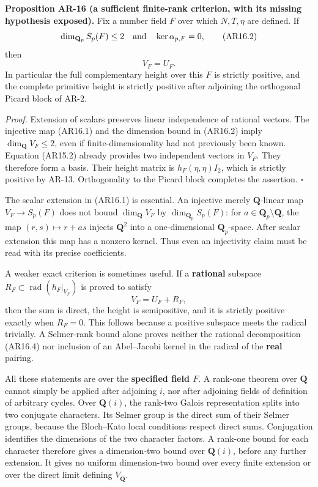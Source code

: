 \textbf{Proposition AR-16 (a sufficient finite-rank criterion, with its
missing hypothesis exposed).} Fix a number field \(F\) over which
\(N,T,\eta\) are defined. If \[
\dim_{\mathbf Q_p}S_p(F)\le2
\quad\hbox{and}\quad
\ker\alpha_{p,F}=0,
\tag{AR16.2}
\] then \[
V_F=U_F.
\tag{AR16.3}
\] In particular the full complementary height over this \(F\) is
strictly positive, and the complete primitive height is strictly
positive after adjoining the orthogonal Picard block of AR-2.

\emph{Proof.} Extension of scalars preserves linear independence of
rational vectors. The injective map (AR16.1) and the dimension bound in
(AR16.2) imply \(\dim_{\mathbf Q}V_F\le2\), even if
finite-dimensionality had not previously been known. Equation (AR15.2)
already provides two independent vectors in \(V_F\). They therefore form
a basis. Their height matrix is \(h_F(\eta,\eta)I_2\), which is strictly
positive by AR-13. Orthogonality to the Picard block completes the
assertion. \(\square\)

The scalar extension in (AR16.1) is essential. An injective merely
\(\mathbf Q\)-linear map \(V_F\to S_p(F)\) does not bound
\(\dim_{\mathbf Q}V_F\) by \(\dim_{\mathbf Q_p}S_p(F)\): for
\(a\in\mathbf Q_p\setminus\mathbf Q\), the map \((r,s)\mapsto r+as\)
injects \(\mathbf Q^2\) into a one-dimensional \(\mathbf Q_p\)-space.
After scalar extension this map has a nonzero kernel. Thus even an
injectivity claim must be read with its precise coefficients.

A weaker exact criterion is sometimes useful. If a \textbf{rational}
subspace \(R_F\subset\operatorname{rad}(h_F|_{V_F})\) is proved to
satisfy \[
V_F=U_F+R_F,
\tag{AR16.4}
\] then the sum is direct, the height is semipositive, and it is
strictly positive exactly when \(R_F=0\). This follows because a
positive subspace meets the radical trivially. A Selmer-rank bound alone
proves neither the rational decomposition (AR16.4) nor inclusion of an
Abel--Jacobi kernel in the radical of the \textbf{real} pairing.

All these statements are over the \textbf{specified field \(F\)}. A
rank-one theorem over \(\mathbf Q\) cannot simply be applied after
adjoining \(i\), nor after adjoining fields of definition of arbitrary
cycles. Over \(\mathbf Q(i)\), the rank-two Galois representation splits
into two conjugate characters. Its Selmer group is the direct sum of
their Selmer groups, because the Bloch--Kato local conditions respect
direct sums. Conjugation identifies the dimensions of the two character
factors. A rank-one bound for each character therefore gives a
dimension-two bound over \(\mathbf Q(i)\), before any further extension.
It gives no uniform dimension-two bound over every finite extension or
over the direct limit defining \(V_{\overline{\mathbf Q}}\).

